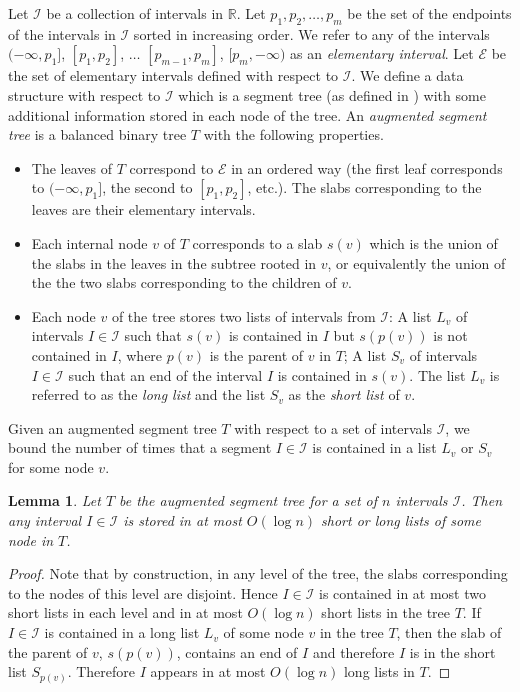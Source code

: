 \documentclass{amsart}
\newtheorem{lemma}[theorem]{Lemma}
\newcommand{\darkblue}{\color{darkblue}} %
\newcommand{\defn}[1]{\textsl{\darkblue #1}} %
\begin{document}
Let $\mathcal{I}$ be a collection of intervals in $\mathbb{R}$. Let $p_1,p_2,\ldots,p_m$ be the set of the endpoints of the intervals in $\mathcal{I}$ sorted in increasing order. We refer to any of the intervals $(-\infty,p_1]$, $[p_1,p_2]$, $\ldots$ $[p_{m-1},p_m]$, $[p_m,-\infty)$ as an \defn{elementary interval}. 
Let $\mathcal{E}$ be the set of elementary intervals defined with respect to $\mathcal{I}$. 
We define a data structure with respect to $\mathcal{I}$ which is a segment tree (as defined in \cite{CGbook}) with some additional information stored in each node of the tree. An \defn{augmented segment tree} is a balanced binary tree $T$ with the following properties. 
\begin{itemize}
\item The leaves of $T$ correspond to $\mathcal{E}$ in an ordered way (the first leaf corresponds to $(-\infty,p_1]$, the second to $[p_1,p_2]$, etc.). The slabs corresponding to the leaves are their elementary intervals.
\item Each internal node $v$ of $T$ corresponds to a slab $s(v)$ which is the union of the slabs in the leaves in the subtree rooted in $v$, or equivalently the union of the the two slabs corresponding to the children of $v$. 
\item Each node $v$ of the tree stores two lists of intervals from $\mathcal{I}$: A list $L_v$ of intervals $I\in \mathcal{I}$ such that $s(v)$ is contained in $I$ but $s(p(v))$ is not contained in $I$, where $p(v)$ is the parent of $v$ in $T$; A list $S_v$ of intervals $I\in \mathcal{I}$ such that an end of the interval $I$ is contained in $s(v)$. The list $L_v$ is referred to as the \defn{long list} and the list $S_v$ as the \defn{short list} of $v$. 
\end{itemize}

Given an augmented segment tree $T$ with respect to a set of intervals $\mathcal{I}$, we bound the number of times that a segment $I\in \mathcal{I}$ is contained in a list $L_v$ or $S_v$ for some node $v$. 

\begin{lemma}\label{lem:segTree}
    Let $T$ be the augmented segment tree for a set of $n$ intervals $\mathcal{I}$.
    Then any interval $I\in \mathcal{I}$ is stored in at most $O(\log n)$ short or long lists of some node in $T$.
\end{lemma}

\begin{proof}
    Note that by construction, in any level of the tree, the slabs corresponding to the nodes of this level are disjoint. Hence $I\in \mathcal{I}$ is contained in at most two short lists in each level and in at most $O(\log n)$ short lists in the tree $T$. If $I\in \mathcal{I}$ is contained in a long list $L_v$ of some node $v$ in the tree $T$, then the slab of the parent of $v$, $s(p(v))$, contains an end of $I$ and therefore $I$ is in the short list $S_{p(v)}$. Therefore $I$ appears in at most $O(\log n)$ long lists in $T$. 
\end{proof}
\end{document}
